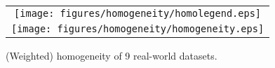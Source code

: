 \begin{figure}[t]
\centering
\begin{small}
\begin{tabular}{c}
\vspace{-3mm}
\texttt{[image: figures/homogeneity/homolegend.eps]}  \\ [-16mm]
    \texttt{[image: figures/homogeneity/homogeneity.eps]}
\end{tabular}


\vspace{-25mm}
\caption{(Weighted) homogeneity of 9 real-world datasets.}
\label{fig:homo}
\vspace{-5mm}
\end{small}

\end{figure}
